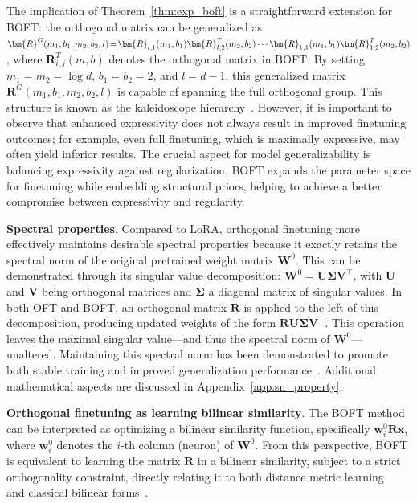 The implication of Theorem~\ref{thm:exp_boft} is a straightforward extension for BOFT: the orthogonal matrix can be generalized as $\thickmuskip=2mu \medmuskip=2mu \bm{R}^G(m_1,b_1,m_2,b_2,l)=\bm{R}_{l,1}(m_1,b_1)\bm{R}_{l,2}^T(m_2,b_2)\cdots\bm{R}_{1,1}(m_1,b_1)\bm{R}_{1,2}^T(m_2,b_2)$, where $\bm{R}_{i,j}^T(m,b)$ denotes the orthogonal matrix in BOFT. By setting $m_1=m_2=\log d$, $b_1=b_2=2$, and $l=d-1$, this generalized matrix $\bm{R}^G(m_1,b_1,m_2,b_2,l)$ is capable of spanning the full orthogonal group. This structure is known as the kaleidoscope hierarchy~\cite{dao2019kaleidoscope}. However, it is important to observe that enhanced expressivity does not always result in improved finetuning outcomes; for example, even full finetuning, which is maximally expressive, may often yield inferior results. The crucial aspect for model generalizability is balancing expressivity against regularization. BOFT expands the parameter space for finetuning while embedding structural priors, helping to achieve a better compromise between expressivity and regularity.

\textbf{Spectral properties}. Compared to LoRA, orthogonal finetuning more effectively maintains desirable spectral properties because it exactly retains the spectral norm of the original pretrained weight matrix $\bm{W}^0$. This can be demonstrated through its singular value decomposition: $\bm{W}^0 = \bm{U}\bm{\Sigma}\bm{V}^\top$, with $\bm{U}$ and $\bm{V}$ being orthogonal matrices and $\bm{\Sigma}$ a diagonal matrix of singular values. In both OFT and BOFT, an orthogonal matrix $\bm{R}$ is applied to the left of this decomposition, producing updated weights of the form $\bm{R}\bm{U}\bm{\Sigma}\bm{V}^\top$. This operation leaves the maximal singular value—and thus the spectral norm of $\bm{W}^0$—unaltered. Maintaining this spectral norm has been demonstrated to promote both stable training and improved generalization performance~\cite{miyato2018spectral,yoshida2017spectral}. Additional mathematical aspects are discussed in Appendix~\ref{app:sn_property}.

\textbf{Orthogonal finetuning as learning bilinear similarity}. The BOFT method can be interpreted as optimizing a bilinear similarity function, specifically $\bm{w}^0_i\bm{R}\bm{x}$, where $\bm{w}^0_i$ denotes the $i$-th column (neuron) of $\bm{W}^0$. From this perspective, BOFT is equivalent to learning the matrix $\bm{R}$ in a bilinear similarity, subject to a strict orthogonality constraint, directly relating it to both distance metric learning~\cite{xing2002distance} and classical bilinear forms~\cite{roman2005advanced}.

